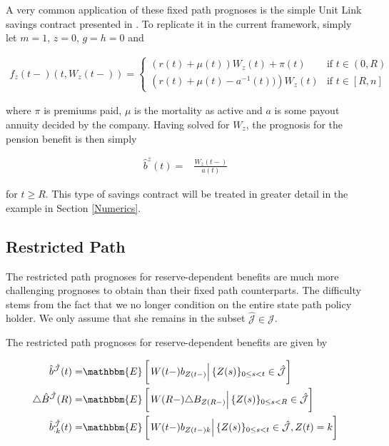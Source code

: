 \documentclass{article}
\newcommand{\1}[1]{\mathbbm{1}_{\left\lbrace #1 \right\rbrace}}
\newcommand{\econd}[2][def]{\mathbbm{E} \left[ \left. #1 \right| #2 \right]}
\theoremstyle{break}
\theoremstyle{remark}
\newenvironment{remark}
  {\pushQED{\qed}\renewcommand{\qedsymbol}{\scalebox{1.4}{$\circ$}}\remarkx}
  {\popQED\endremarkx}
\numberwithin{equation}{section}
\begin{document}
\begin{remark}
	A very common application of these fixed path prognoses is the simple Unit Link savings contract presented in \cite{Munk}. To replicate it in the current framework, simply let $m=1$, $z = 0$, $g=h=0$ and

\begin{align*}
	f_z(t-)(t,W_z(t-)) =
	\left\{
	\begin{array}{ll}
		\left( r(t) + \mu(t) \right) W_z(t) + \pi(t) & \mbox{if } t \in (0,R) \\
		\left( r(t) + \mu(t) - a^{-1}(t)) \right) W_z(t) & \mbox{if } t \in [R,n]
	\end{array}
	\right.
\end{align*}

where $\pi$ is premiums paid, $\mu$ is the mortality as active and $a$ is some payout annuity decided by the company. Having solved for $W_z$, the prognosis for the pension benefit is then simply

\begin{align*}
	\hat{b}^{z}(t) =& \frac{W_z(t-)}{a(t)}
\end{align*}

for $t \geq R$. This type of savings contract will be treated in greater detail in the example in Section \ref{Numerics}.
\end{remark}

\newpage
\subsection{Restricted Path}

The restricted path prognoses for reserve-dependent benefits are much more challenging prognoses to obtain than their fixed path counterparts. The difficulty stems from the fact that we no longer condition on the entire state path policy holder. We only assume that she remains in the subset $\hat{\mathcal{J}} \in \mathcal{J}$.

The restricted path prognoses for reserve-dependent benefits are given by

\begin{align*}
\hat{b}^{\hat{\mathcal{J}}}(t) =& \econd[W(t-) b_{Z(t-)}]{\{Z(s) \}_{0 \leq s < t} \in \hat{\mathcal{J}}} \\
\triangle \hat{B}^{\hat{\mathcal{J}}}(R) =& \econd[W(R-) \triangle B_{Z(R-)}]{\{Z(s) \}_{0 \leq s < R} \in \hat{\mathcal{J}}} \\
\hat{b}^{\hat{\mathcal{J}}}_{\cdot k}(t) =& \econd[W(t-) b_{Z(t-)k}]{\{Z(s) \}_{0 \leq s < t} \in \hat{\mathcal{J}}, Z(t) = k}
\end{align*}
\end{document}

